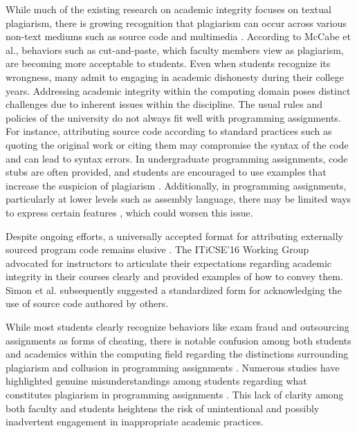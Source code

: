 While much of the existing research on academic integrity focuses on textual plagiarism, there is growing recognition that plagiarism can occur across various non-text mediums such as source code and multimedia \cite{Marcin2016,10.1145/2526968.2526971}. According to McCabe et al.\cite{84f6c08b47844b54868caf82c625fc66}, behaviors such as cut-and-paste, which faculty members view as plagiarism, are becoming more acceptable to students. Even when students recognize its wrongness, many admit to engaging in academic dishonesty during their college years\cite{Bernardi2004-BERETD}. Addressing academic integrity within the computing domain poses distinct challenges due to inherent issues within the discipline. The usual rules and policies of the university do not always fit well with programming assignments. For instance, attributing source code according to standard practices such as quoting the original work or citing them may compromise the syntax of the code and can lead to syntax errors. 
In undergraduate programming assignments, code stubs are often provided, and students are encouraged to use examples that increase the suspicion of plagiarism \cite{10.5555/1151869.1151888}. Additionally, in programming assignments, particularly at lower levels such as assembly language, there may be limited ways to express certain features \cite{10.1145/3160489.3160502}, which could worsen this issue.

Despite ongoing efforts, a universally accepted format for attributing externally sourced program code remains elusive \cite{10.1145/1562877.1562900}. The ITiCSE’16 Working Group \cite{10.1145/3024906.3024910} advocated for instructors to articulate their expectations regarding academic integrity in their courses clearly and provided examples of how to convey them. Simon et al.\cite{10.1145/3160489.3160502} subsequently suggested a standardized form for acknowledging the use of source code authored by others. 

While most students clearly recognize behaviors like exam fraud and outsourcing assignments as forms of cheating, there is notable confusion among both students and academics within the computing field regarding the distinctions surrounding plagiarism and collusion in programming assignments \cite{SCPlagiarism}. Numerous studies have highlighted genuine misunderstandings among students regarding what constitutes plagiarism in programming assignments \cite{SCPlagiarism, Cosma2008TowardsAD, 10.1145/637610.544468, 10.1145/2526968.2526971}. This lack of clarity among both faculty and students heightens the risk of unintentional and possibly inadvertent engagement in inappropriate academic practices. 

